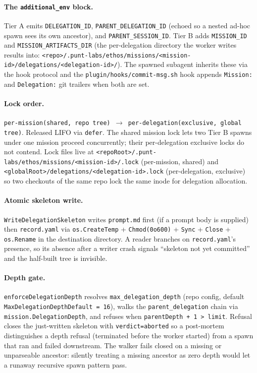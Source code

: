 \documentclass[a4paper,10pt]{article}
\newcommand{\field}[1]{\texttt{#1}}
\newcommand{\fpath}[1]{\texttt{#1}}
\begin{document}
\paragraph{The \field{additional\_env} block.}  Tier A emits
\texttt{DELEGATION\_ID}, \texttt{PARENT\_DELEGATION\_ID}
(echoed so a nested ad-hoc spawn sees its own ancestor), and
\texttt{PARENT\_SESSION\_ID}.  Tier B adds \texttt{MISSION\_ID}
and \texttt{MISSION\_ARTIFACTS\_DIR} (the per-delegation directory
the worker writes results into:
\fpath{<repo>/.punt-labs/ethos/missions/<mission-id>/delegations/<delegation-id>/}).  The
spawned subagent inherits these via the hook protocol and the
\fpath{plugin/hooks/commit-msg.sh} hook appends \texttt{Mission:} and
\texttt{Delegation:} git trailers when both are set.

\paragraph{Lock order.}
\texttt{per-mission(shared, repo tree)
\(\to\) per-delegation(exclusive, global tree)}.  Released LIFO via
\texttt{defer}.  The shared mission lock lets two Tier B spawns
under one mission proceed concurrently; their per-delegation
exclusive locks do not contend.  Lock files live at
\fpath{<repoRoot>/.punt-labs/ethos/missions/<mission-id>/.lock} (per-mission,
shared) and \fpath{<globalRoot>/delegations/<delegation-id>.lock}
(per-delegation, exclusive) so two checkouts of the same repo lock
the same inode for delegation allocation.

\paragraph{Atomic skeleton write.}
\texttt{WriteDelegationSkeleton} writes \texttt{prompt.md} first
(if a prompt body is supplied) then \texttt{record.yaml} via
\texttt{os.CreateTemp} + \texttt{Chmod(0o600)} + \texttt{Sync}
+ \texttt{Close} + \texttt{os.Rename} in the destination
directory.  A reader branches on \texttt{record.yaml}'s presence,
so its absence after a writer crash signals ``skeleton not yet
committed'' and the half-built tree is invisible.

\paragraph{Depth gate.}
\texttt{enforceDelegationDepth} resolves
\texttt{max\_delegation\_depth} (repo config, default
\texttt{MaxDelegationDepthDefault = 16}), walks the
\field{parent\_delegation} chain via
\texttt{mission.DelegationDepth}, and refuses when
\texttt{parentDepth + 1 > limit}.  Refusal closes the
just-written skeleton with \field{verdict=aborted} so a
post-mortem distinguishes a depth refusal (terminated before the
worker started) from a spawn that ran and failed downstream.
The walker fails closed on a missing or unparseable ancestor:
silently treating a missing ancestor as zero depth would let a
runaway recursive spawn pattern pass.
\end{document}
